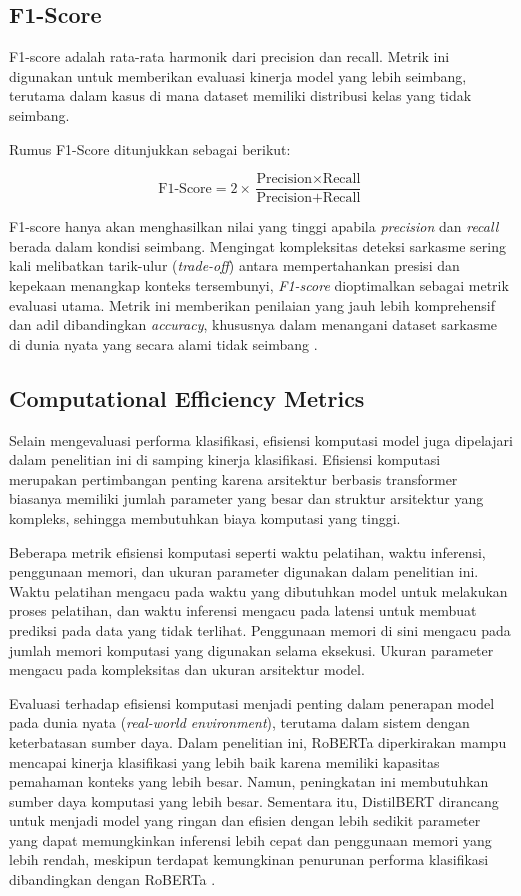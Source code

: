 \subsection{F1-Score}
F1-score adalah rata-rata harmonik dari precision dan recall. Metrik ini digunakan untuk memberikan evaluasi kinerja model yang lebih seimbang, terutama dalam kasus di mana dataset memiliki distribusi kelas yang tidak seimbang.

Rumus F1-Score ditunjukkan sebagai berikut:

\begin{equation}
\text{F1-Score} = 2 \times \frac{\text{Precision} \times \text{Recall}}{\text{Precision} + \text{Recall}}
\end{equation}

F1-score hanya akan menghasilkan nilai yang tinggi apabila \textit{precision} dan \textit{recall} berada dalam kondisi seimbang. Mengingat kompleksitas deteksi sarkasme sering kali melibatkan tarik-ulur (\textit{trade-off}) antara mempertahankan presisi dan kepekaan menangkap konteks tersembunyi, \textit{F1-score} dioptimalkan sebagai metrik evaluasi utama. Metrik ini memberikan penilaian yang jauh lebih komprehensif dan adil dibandingkan \textit{accuracy}, khususnya dalam menangani dataset sarkasme di dunia nyata yang secara alami tidak seimbang \cite{dubey2025unpacking}.

\subsection{Computational Efficiency Metrics}
Selain mengevaluasi performa klasifikasi, efisiensi komputasi model juga dipelajari dalam penelitian ini di samping kinerja klasifikasi. Efisiensi komputasi merupakan pertimbangan penting karena arsitektur berbasis transformer biasanya memiliki jumlah parameter yang besar dan struktur arsitektur yang kompleks, sehingga membutuhkan biaya komputasi yang tinggi.

Beberapa metrik efisiensi komputasi seperti waktu pelatihan, waktu inferensi, penggunaan memori, dan ukuran parameter digunakan dalam penelitian ini. Waktu pelatihan mengacu pada waktu yang dibutuhkan model untuk melakukan proses pelatihan, dan waktu inferensi mengacu pada latensi untuk membuat prediksi pada data yang tidak terlihat. Penggunaan memori di sini mengacu pada jumlah memori komputasi yang digunakan selama eksekusi. Ukuran parameter mengacu pada kompleksitas dan ukuran arsitektur model.

Evaluasi terhadap efisiensi komputasi menjadi penting dalam penerapan model pada dunia nyata (\textit{real-world environment}), terutama dalam sistem dengan keterbatasan sumber daya. Dalam penelitian ini, RoBERTa diperkirakan mampu mencapai kinerja klasifikasi yang lebih baik karena memiliki kapasitas pemahaman konteks yang lebih besar. Namun, peningkatan ini membutuhkan sumber daya komputasi yang lebih besar. Sementara itu, DistilBERT dirancang untuk menjadi model yang ringan dan efisien dengan lebih sedikit parameter yang dapat memungkinkan inferensi lebih cepat dan penggunaan memori yang lebih rendah, meskipun terdapat kemungkinan penurunan performa klasifikasi dibandingkan dengan RoBERTa \cite{dubey2025unpacking}.

